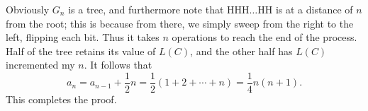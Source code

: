 Obviously $G_n$ is a tree, and furthermore note that $\text{HHH}\ldots\text{HH}$ is at a distance of $n$ from the root; this is because from there, we simply sweep from the right to the left, flipping each bit. Thus it takes $n$ operations to reach the end of the process. Half of the tree retains its value of $L(C)$, and the other half has $L(C)$ incremented my $n$. It follows that \[a_n=a_{n-1}+\frac12n=\frac12(1+2+\cdots+n)=\frac14n(n+1).\]
This completes the proof.

